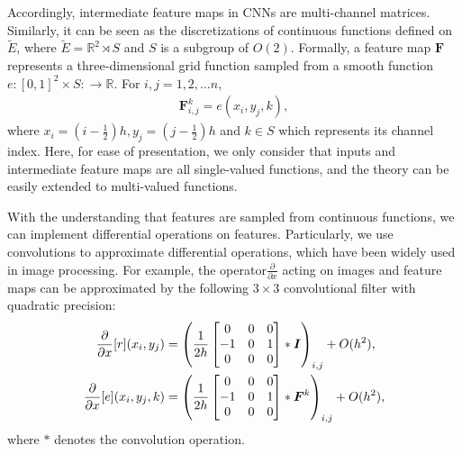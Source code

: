 \documentclass{article}
\begin{document}
Accordingly, intermediate feature maps in CNNs are multi-channel matrices. Similarly, 
it can be seen as the  discretizations of continuous functions defined on $\tilde E$, where $\tilde E =\mathbb{R}^2\rtimes S$ and $S$ is a subgroup of $O(2)$. Formally, a feature map $\bm{F}$ represents a three-dimensional grid function sampled from a smooth function $e:[0,1]^2\times S:\to \mathbb{R}$.
For $i,j=1,2,\dots n$,
\begin{align}
\bm{F}^k_{i,j}=e(x_i,y_j,k),
\end{align}
where $x_i=(i-\frac{1}{2})h,y_j=(j-\frac{1}{2})h$ and $k\in S$ which represents its channel index. Here, for ease of presentation, we only consider that inputs and intermediate feature maps are all single-valued functions, and the theory can be easily extended to multi-valued functions.

With the understanding that features are sampled from continuous functions, we can implement differential operations on features. Particularly, we use convolutions to approximate differential operations, which have been widely used in image processing. For example, the operator$\frac{\partial }{\partial x}$ acting on images and feature maps can be approximated by the following $3\times3$ convolutional filter with quadratic precision:
\begin{align}
\frac{\partial }{\partial x}[r](x_i,y_j)&=\left(\frac{1}{2h}\begin{bmatrix}
0&0&0\\
-1&0&1\\
0&0&0
\end{bmatrix}\ast \bm{I}\right)_{i,j}+O(h^2),\notag\\
\frac{\partial }{\partial x}[e](x_i,y_j,k)&=\left(\frac{1}{2h}\begin{bmatrix}
0&0&0\\
-1&0&1\\
0&0&0
\end{bmatrix}\ast \bm{F}^k\right)_{i,j}+O(h^2),\notag
\label{9}
\end{align}
where $\ast$ denotes the convolution operation.
\end{document}

